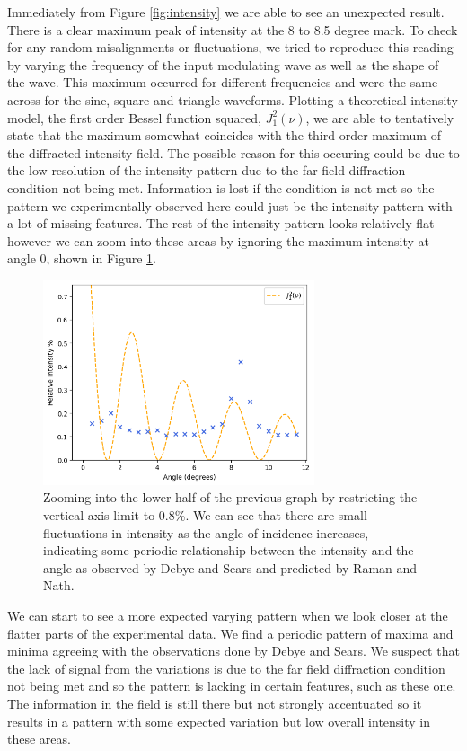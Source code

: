 \documentclass[aps,prl,reprint,10pt,amsmath,amssymb,superscriptaddress,a4paper]{revtex4-2}
\begin{document}
Immediately from Figure \ref{fig:intensity} we are able to see an unexpected result. There is a clear maximum peak of intensity at the 8 to 8.5 degree mark. To check for any random misalignments or fluctuations,
we tried to reproduce this reading by varying the frequency of the input modulating wave as well as the shape of the wave. This maximum occurred for different frequencies and were the same across for the sine, square 
and triangle waveforms. Plotting a theoretical intensity model, the first order Bessel function squared, $J_1^2(\nu)$, we are able to tentatively state that the maximum somewhat coincides with the third order maximum 
of the diffracted intensity field. The possible reason for this occuring could be due to the low resolution of the intensity pattern due to the far field diffraction condition not being met. Information is lost if the 
condition is not met so the pattern we experimentally observed here could just be the intensity pattern with a lot of missing features. The rest of the intensity pattern looks relatively flat however we can zoom into 
these areas by ignoring the maximum intensity at angle 0, shown in Figure \ref{fig:intensity2}.

\begin{figure}[!htbp]
    \includegraphics[width = 8cm]{../Figures/intensity2.png}
    \caption{Zooming into the lower half of the previous graph by restricting the 
    vertical axis limit to 0.8\%. We can see that there are small fluctuations in 
    intensity as the angle of incidence increases, indicating some periodic relationship 
    between the intensity and the angle as observed by Debye and Sears and predicted by 
    Raman and Nath.}
    \label{fig:intensity2}
\end{figure}

We can start to see a more expected varying pattern when we look closer at the flatter parts of the experimental data. We find a periodic pattern of maxima and minima agreeing with the observations done by Debye and Sears.
We suspect that the lack of signal from the variations is due to the far field diffraction condition not being met and so the pattern is lacking in certain features, such as these one. The information in the field is still there 
but not strongly accentuated so it results in a pattern with some expected variation but low overall intensity in these areas.
\end{document}
